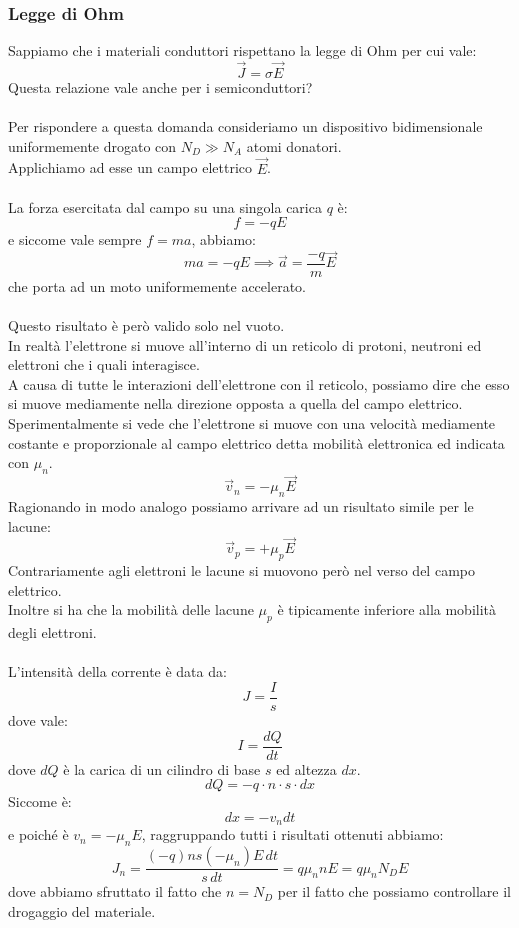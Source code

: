 \documentclass{article}
\numberwithin{equation}{subsection}
\begin{document}
	\subsubsection{Legge di Ohm}
	Sappiamo che i materiali conduttori rispettano la legge di Ohm per cui vale:
	$$\vec{J} = \sigma \vec{E}$$
	Questa relazione vale anche per i semiconduttori?\\\\
	Per rispondere a questa domanda consideriamo un dispositivo bidimensionale uniformemente drogato con $N_D \gg N_A$ atomi donatori. \\
	Applichiamo ad esse un campo elettrico $\vec{E}$.\\\\
	La forza esercitata dal campo su una singola carica $q$ è:
	$$f = -qE$$
	e siccome vale sempre $f = ma$, abbiamo:
	$$ma = -qE \implies \vec{a} = \frac{-q}{m} \vec{E}$$
	che porta ad un moto uniformemente accelerato.\\\\
	Questo risultato è però valido solo nel vuoto. \\
	In realtà l’elettrone si muove all’interno di un reticolo di protoni, neutroni ed elettroni che i quali interagisce. \\
	A causa di tutte le interazioni dell’elettrone con il reticolo, possiamo dire che esso si muove mediamente nella direzione opposta a quella del campo elettrico. \\
	Sperimentalmente si vede che l’elettrone si muove con una velocità mediamente costante e proporzionale al campo elettrico detta mobilità elettronica ed indicata con $\mu_n$.
	$$\vec{v}_n = -\mu_n \vec{E}$$
	Ragionando in modo analogo possiamo arrivare ad un risultato simile per le lacune:
	$$\vec{v}_p = +\mu_p \vec{E}$$
	Contrariamente agli elettroni le lacune si muovono però nel verso del campo elettrico. \\
	Inoltre si ha che la mobilità delle lacune $\mu_p$ è tipicamente inferiore alla mobilità degli elettroni.\\\\
	L’intensità della corrente è data da:
	$$J = \frac{I}{s}$$
	dove vale:
	$$I = \frac{dQ}{dt}$$
	dove $dQ$ è la carica di un cilindro di base $s$ ed altezza $dx$.
	$$dQ = -q \cdot n \cdot s \cdot dx$$
	Siccome è:
	$$dx = -v_n dt$$
	e poiché è $v_n = -\mu_n E$, raggruppando tutti i risultati ottenuti abbiamo:
	$$J_n = \frac{(-q)ns(-\mu_n)E \, dt}{s \, dt} = q\mu_n nE = q\mu_n N_D E$$
	dove abbiamo sfruttato il fatto che $n = N_D$ per il fatto che possiamo controllare il drogaggio del materiale. \\
\end{document}
